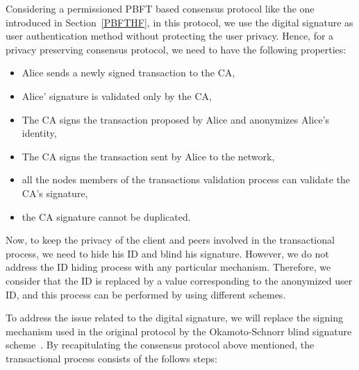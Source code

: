 \documentclass[conference]{IEEEtran}
\begin{document}
Considering a permissioned PBFT based consensus protocol like the one introduced in Section~\ref{PBFTHF}, in this protocol, we use the digital signature as user authentication method without protecting the user privacy. Hence, for a privacy preserving consensus protocol, we need to have the following properties:

\begin{itemize}
    \item Alice sends a newly signed transaction to the CA,
    \item Alice’ signature is validated only by the CA,
    \item The CA signs the transaction proposed by Alice and anonymizes Alice’s identity,
    \item The CA signs the transaction sent by Alice to the network,
    \item all the nodes members of the transactions validation process can validate the CA's signature,
    \item the CA signature cannot be duplicated.
\end{itemize}

Now, to keep the privacy of the client and peers involved in the transactional process, we need to hide his ID and blind his signature. However, we do not address the ID hiding process with any particular mechanism. Therefore, we consider that the ID is replaced by a value corresponding to the anonymized user ID, and this process can be performed by using different schemes.

To address the issue related to the digital signature, we will replace the signing mechanism used in the original protocol by the Okamoto-Schnorr blind signature scheme~\cite{okamoto1992provably}. By recapitulating the consensus protocol above mentioned, the transactional process consists of the follows steps:
\end{document}
